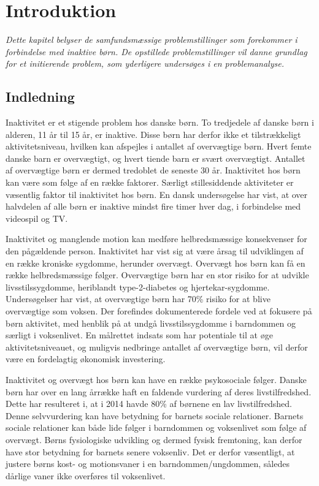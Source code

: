 \chapter{Introduktion}
\textit{Dette kapitel belyser de samfundsmæssige problemstillinger som forekommer i forbindelse med inaktive børn.
De opstillede problemstillinger vil danne grundlag for et initierende problem, som yderligere undersøges i en problemanalyse.}

\section{Indledning}
Inaktivitet er et stigende problem hos danske børn. To tredjedele af danske børn i alderen, 11 år til 15 år, er inaktive\citep{SundhedsstyrrelsenFaktaark}. Disse børn har derfor ikke et tilstrækkeligt aktivitetsniveau, hvilken kan  afspejles i antallet af overvægtige børn. Hvert femte danske barn er overvægtigt, og hvert tiende barn er svært overvægtigt\citep{Universitet2014}. Antallet af overvægtige børn er dermed tredoblet de seneste 30 år\citep{Vindum2012}. \newline
Inaktivitet hos børn kan være som følge af en række faktorer. Særligt stillesiddende aktiviteter er væsentlig faktor til inaktivitet hos børn. En dansk undersøgelse har vist, at over halvdelen af alle børn er inaktive mindst fire timer hver dag, i forbindelse med videospil og TV\citep{Universitet2014}.

Inaktivitet og manglende motion kan medføre helbredsmæssige konsekvenser for den pågældende person. Inaktivitet har vist sig at være årsag til udviklingen af en række kroniske sygdomme, herunder overvægt. \newline 
Overvægt hos børn kan få en række helbredsmæssige følger. Overvægtige børn har en stor risiko for at udvikle livsstilssygdomme, heriblandt type-2-diabetes og hjertekar-sygdomme. Undersøgelser har vist, at overvægtige børn har 70\% risiko for at blive overvægtige som voksen.\citep{Reilly2006}
Der forefindes dokumenterede fordele ved at fokusere på børn aktivitet, med henblik på at undgå livsstilssygdomme i barndommen og særligt i voksenlivet. En målrettet indsats som har potentiale til at øge aktivitetsniveauet, og muligvis nedbringe antallet af overvægtige børn, vil derfor være en fordelagtig økonomisk investering\citep{COWI2015}.

Inaktivitet og overvægt hos børn kan have en række psykosociale følger. Danske børn har over en lang årrække haft en faldende vurdering af deres livstilfredshed. Dette har resulteret i, at i 2014 havde 80\% af børnene en lav livstilfredshed\citep{Universitet2014}. Denne selvvurdering kan have betydning for barnets sociale relationer. Barnets sociale relationer kan både lide følger i barndommen og voksenlivet som følge af overvægt\citep{StatensInstitutforFolkesundhed2007}. \newline
Børns fysiologiske udvikling og dermed fysisk fremtoning, kan derfor have stor betydning for barnets senere voksenliv. Det er derfor væsentligt, at justere børns kost- og motionsvaner i en barndommen/ungdommen, således dårlige vaner ikke overføres til voksenlivet. 

